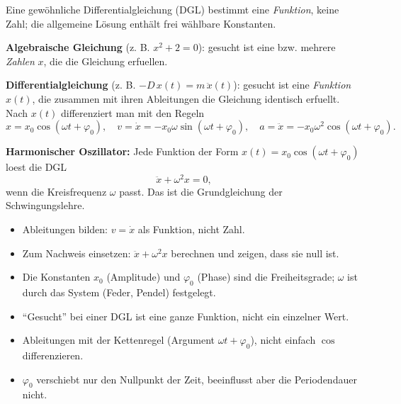 

Eine gewöhnliche Differentialgleichung (DGL) bestimmt eine \emph{Funktion},
keine Zahl; die allgemeine Lösung enthält frei wählbare Konstanten.

\begin{werkzeugkasten}[Werkzeuge]
\textbf{Algebraische Gleichung} (z. B. $x^2+2=0$): gesucht ist eine bzw.
mehrere \emph{Zahlen} $x$, die die Gleichung erfuellen.

\textbf{Differentialgleichung} (z. B. $-D\,x(t)=m\,\ddot x(t)$): gesucht
ist eine \emph{Funktion} $x(t)$, die zusammen mit ihren Ableitungen die
Gleichung identisch erfuellt. Nach $x(t)$ differenziert man mit den Regeln
\begin{equation}
  x=x_0\cos(\omega t+\varphi_0),\quad
  v=\dot x=-x_0\omega\sin(\omega t+\varphi_0),\quad
  a=\ddot x=-x_0\omega^2\cos(\omega t+\varphi_0).
\end{equation}

\textbf{Harmonischer Oszillator:} Jede Funktion der Form
$x(t)=x_0\cos(\omega t+\varphi_0)$ loest die DGL
\begin{equation}
  \ddot x+\omega^2 x=0,
\end{equation}
wenn die Kreisfrequenz $\omega$ passt. Das ist die Grundgleichung der
Schwingungslehre.
\end{werkzeugkasten}

\begin{werkzeugkasten}[Vorgehen]
\begin{itemize}
  \item Ableitungen bilden: $v=\dot x$ als Funktion, nicht Zahl.
  \item Zum Nachweis einsetzen: $\ddot x+\omega^2x$ berechnen und zeigen,
        dass sie null ist.
  \item Die Konstanten $x_0$ (Amplitude) und $\varphi_0$ (Phase) sind die
        Freiheitsgrade; $\omega$ ist durch das System (Feder, Pendel)
        festgelegt.
\end{itemize}
\end{werkzeugkasten}

\begin{achtung}
\begin{itemize}
  \item ``Gesucht'' bei einer DGL ist eine ganze Funktion, nicht ein
        einzelner Wert.
  \item Ableitungen mit der Kettenregel (Argument $\omega t+\varphi_0$),
        nicht einfach $\cos$ differenzieren.
  \item $\varphi_0$ verschiebt nur den Nullpunkt der Zeit, beeinflusst aber
        die Periodendauer nicht.
\end{itemize}
\end{achtung}
